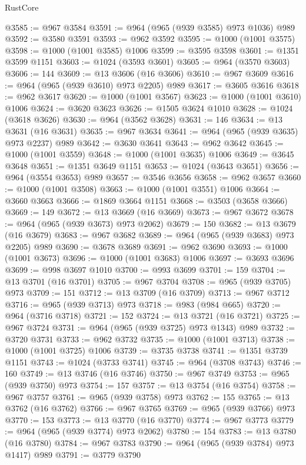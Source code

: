 \begin{lexlean}{RustCore}
\begin{coremodule}
@3585 := @967 @3584
@3591 := @964 (@965 (@939 @3585) @973 @1036) @989
@3592 := @3580 @3591
@3593 := @962 @3592
@3595 := @1000 (@1001 @3575)
@3598 := @1000 (@1001 @3585) @1006
@3599 := @3595 @3598
@3601 := @1351 @3599 @1151
@3603 := @1024 (@3593 @3601)
@3605 := @964 (@3570 @3603)
@3606 := 144
@3609 := @13 @3606 (@16 @3606)
@3610 := @967 @3609
@3616 := @964 (@965 (@939 @3610) @973 @2205) @989
@3617 := @3605 @3616
@3618 := @962 @3617
@3620 := @1000 (@1001 @3567)
@3623 := @1000 (@1001 @3610) @1006
@3624 := @3620 @3623
@3626 := @1505 @3624 @1010
@3628 := @1024 (@3618 @3626)
@3630 := @964 (@3562 @3628)
@3631 := 146
@3634 := @13 @3631 (@16 @3631)
@3635 := @967 @3634
@3641 := @964 (@965 (@939 @3635) @973 @2237) @989
@3642 := @3630 @3641
@3643 := @962 @3642
@3645 := @1000 (@1001 @3559)
@3648 := @1000 (@1001 @3635) @1006
@3649 := @3645 @3648
@3651 := @1351 @3649 @1151
@3653 := @1024 (@3643 @3651)
@3656 := @964 (@3554 @3653) @989
@3657 := @3546 @3656
@3658 := @962 @3657
@3660 := @1000 (@1001 @3508)
@3663 := @1000 (@1001 @3551) @1006
@3664 := @3660 @3663
@3666 := @1869 @3664 @1151
@3668 := @3503 (@3658 @3666)
@3669 := 149
@3672 := @13 @3669 (@16 @3669)
@3673 := @967 @3672
@3678 := @964 (@965 (@939 @3673) @973 @2062)
@3679 := 150
@3682 := @13 @3679 (@16 @3679)
@3683 := @967 @3682
@3689 := @964 (@965 (@939 @3683) @973 @2205) @989
@3690 := @3678 @3689
@3691 := @962 @3690
@3693 := @1000 (@1001 @3673)
@3696 := @1000 (@1001 @3683) @1006
@3697 := @3693 @3696
@3699 := @998 @3697 @1010
@3700 := @993 @3699
@3701 := 159
@3704 := @13 @3701 (@16 @3701)
@3705 := @967 @3704
@3708 := @965 (@939 @3705) @973
@3709 := 151
@3712 := @13 @3709 (@16 @3709)
@3713 := @967 @3712
@3716 := @965 (@939 @3713) @973
@3718 := @983 (@984 @665)
@3720 := @964 (@3716 @3718)
@3721 := 152
@3724 := @13 @3721 (@16 @3721)
@3725 := @967 @3724
@3731 := @964 (@965 (@939 @3725) @973 @1343) @989
@3732 := @3720 @3731
@3733 := @962 @3732
@3735 := @1000 (@1001 @3713)
@3738 := @1000 (@1001 @3725) @1006
@3739 := @3735 @3738
@3741 := @1351 @3739 @1151
@3743 := @1024 (@3733 @3741)
@3745 := @964 (@3708 @3743)
@3746 := 160
@3749 := @13 @3746 (@16 @3746)
@3750 := @967 @3749
@3753 := @965 (@939 @3750) @973
@3754 := 157
@3757 := @13 @3754 (@16 @3754)
@3758 := @967 @3757
@3761 := @965 (@939 @3758) @973
@3762 := 155
@3765 := @13 @3762 (@16 @3762)
@3766 := @967 @3765
@3769 := @965 (@939 @3766) @973
@3770 := 153
@3773 := @13 @3770 (@16 @3770)
@3774 := @967 @3773
@3779 := @964 (@965 (@939 @3774) @973 @2062)
@3780 := 154
@3783 := @13 @3780 (@16 @3780)
@3784 := @967 @3783
@3790 := @964 (@965 (@939 @3784) @973 @1417) @989
@3791 := @3779 @3790

\end{coremodule}
\end{lexlean}
